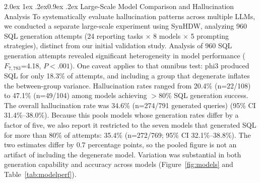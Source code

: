 \documentclass[10pt,twocolumn]{article}
\makeatletter
\renewcommand\subsection{\@startsection{subsection}{2}{\z@}%
  {2.0ex \@plus 1ex \@minus .2ex}{0.9ex \@plus .2ex}%
  {\normalfont\normalsize\bfseries}}
\makeatother
\begin{document}
\subsection{Large-Scale Model Comparison and Hallucination Analysis}
To systematically evaluate hallucination patterns across multiple LLMs, we
conducted a separate large-scale experiment using SynHDW, analyzing 960 SQL
generation attempts (24 reporting tasks $\times$ 8 models $\times$ 5 prompting
strategies), distinct from our initial validation study. Analysis of 960 SQL generation attempts revealed significant heterogeneity in model performance ($F_{7,783}$=4.18, $P<.001$). One caveat applies to that omnibus test: phi3 produced SQL for only 18.3\% of attempts, and including a group that degenerate inflates the between-group variance. Hallucination rates ranged from 20.4\%
(n=22/108) to 47.1\% (n=49/104) among models achieving $>$80\% SQL generation
success. The overall hallucination rate was 34.6\% (n=274/791 generated queries) (95\% CI 31.4\%--38.0\%). Because this pools models whose generation rates differ by a factor of five, we also report it restricted to the seven models that generated SQL for more than 80\% of attempts: 35.4\% (n=272/769; 95\% CI 32.1\%--38.8\%). The two estimates differ by 0.7 percentage points, so the pooled figure is not an artifact of including the degenerate model. Variation was substantial in both generation capability and accuracy across models
(Figure~\ref{fig:models} and Table~\ref{tab:modelperf}).
\end{document}
